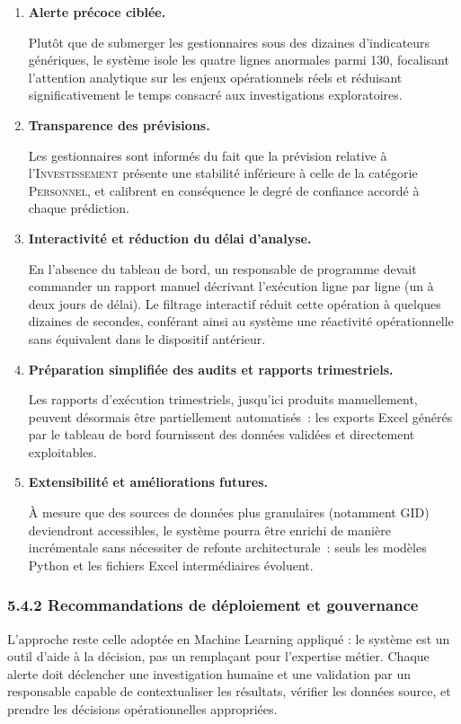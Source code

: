 \begin{enumerate}
    \item \textbf{Alerte précoce ciblée.}

    Plutôt que de submerger les gestionnaires sous des dizaines d'indicateurs
    génériques, le système isole les quatre lignes anormales parmi 130, focalisant
    l'attention analytique sur les enjeux opérationnels réels et réduisant
    significativement le temps consacré aux investigations exploratoires.

    \item \textbf{Transparence des prévisions.}

    Les gestionnaires sont informés du fait que la prévision relative à
    l'\textsc{Investissement} présente une stabilité inférieure à celle de
    la catégorie \textsc{Personnel}, et calibrent en conséquence le degré de
    confiance accordé à chaque prédiction.

    \item \textbf{Interactivité et réduction du délai d'analyse.}

    En l'absence du tableau de bord, un responsable de programme devait commander
    un rapport manuel décrivant l'exécution ligne par ligne (un à deux jours de
    délai). Le filtrage interactif réduit cette opération à quelques dizaines
    de secondes, conférant ainsi au système une réactivité opérationnelle
    sans équivalent dans le dispositif antérieur.

    \item \textbf{Préparation simplifiée des audits et rapports trimestriels.}

    Les rapports d'exécution trimestriels, jusqu'ici produits manuellement,
    peuvent désormais être partiellement automatisés~: les exports Excel
    générés par le tableau de bord fournissent des données validées et
    directement exploitables.

    \item \textbf{Extensibilité et améliorations futures.}

    À mesure que des sources de données plus granulaires (notamment GID)
    deviendront accessibles, le système pourra être enrichi de manière
    incrémentale sans nécessiter de refonte architecturale~: seuls les
    modèles Python et les fichiers Excel intermédiaires évoluent.

\end{enumerate}

\subsubsection*{5.4.2 \quad Recommandations de déploiement et gouvernance}

L'approche reste celle adopt\'ee en Machine Learning appliqu\'e : le syst\`eme est un outil d'aide
à la décision, pas un remplaçant pour l'expertise métier. Chaque alerte doit déclencher une
investigation humaine et une validation par un responsable capable de contextualiser les
résultats, vérifier les données source, et prendre les décisions opérationnelles appropriées.
